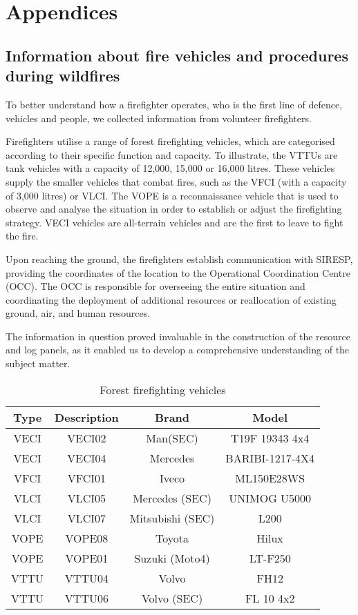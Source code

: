 \chapter{Appendices}

\section{Information about fire vehicles and procedures during wildfires}
To better understand how a firefighter operates, who is the 
first line of defence, vehicles and people, we collected 
information from volunteer firefighters. \par
Firefighters utilise a range of forest firefighting vehicles, 
which are categorised according to their specific function and 
capacity. To illustrate, the VTTUs are tank vehicles with a 
capacity of 12,000, 15,000 or 16,000 litres. These vehicles 
supply the smaller vehicles that combat fires, such as the 
VFCI (with a capacity of 3,000 litres) or VLCI. The VOPE is a 
reconnaissance vehicle that is used to observe and analyse 
the situation in order to establish or adjust the firefighting
strategy. VECI vehicles are all-terrain vehicles and are the 
first to leave to fight the fire. \par
Upon reaching the ground, the firefighters establish 
communication with SIRESP, providing the coordinates of the 
location to the Operational Coordination Centre (OCC). The OCC
is responsible for overseeing the entire situation and 
coordinating the deployment of additional resources or 
reallocation of existing ground, air, and human resources. \par
The information in question proved invaluable in the construction 
of the resource and log panels, as it enabled us to develop a 
comprehensive understanding of the subject matter. \\ 
\begin{table}[H]
    \centering 
\caption{Forest firefighting vehicles} 
\begin{tabular}{ |c|c|c|c| } 
\hline
\textbf{Type} & \textbf{Description} & \textbf{Brand} & \textbf{Model} \\ 
\hline
VECI & VECI02 & Man(SEC) & T19F 19343 4x4 \\
\hline 
VECI & VECI04 & Mercedes & BARIBI-1217-4X4 \\ 
\hline
VFCI & VFCI01 & Iveco & ML150E28WS \\ 
\hline 
VLCI & VLCI05 & Mercedes (SEC) & UNIMOG U5000 \\ 
\hline 
VLCI & VLCI07 & Mitsubishi (SEC) & L200 \\ 
\hline 
VOPE & VOPE08 & Toyota & Hilux \\ 
\hline 
VOPE & VOPE01 & Suzuki (Moto4) & LT-F250 \\ 
\hline 
VTTU & VTTU04 & Volvo & FH12 \\
\hline 
VTTU & VTTU06 & Volvo (SEC) & FL 10 4x2 \\ 
\hline
\end{tabular}
\end{table}
